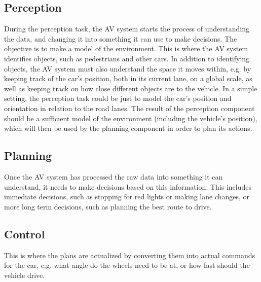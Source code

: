 \subsection{Perception}\label{ssec:tasksForAVs-Perception}
During the perception task, the AV system starts the process of understanding the data, and changing it into something it can use to make decisions.
The objective is to make a model of the environment.
This is where the AV system identifies objects, such as pedestrians and other cars.
In addition to identifying objects, the AV system must also understand the space it moves within, e.g. by keeping track of the car's position, both in its current lane, on a global scale, as well as keeping track on how close different objects are to the vehicle.
In a simple setting, the perception task could be just to model the car's position and orientation in relation to the road lanes.
The result of the perception component should be a sufficient model of the environment (including the vehicle's position), which will then be used by the planning component in order to plan its actions.
\cite{pendleton_perception_2017}

\subsection{Planning}
Once the AV system has processed the raw data into something it can understand, it needs to make decisions based on this information.
This includes immediate decisions, such as stopping for red lights or making lane changes, or more long term decisions, such as planning the best route to drive.
\cite{pendleton_perception_2017}

\subsection{Control}
This is where the plans are actualized by converting them into actual commands for the car, e.g. what angle do the wheels need to be at, or how fast should the vehicle drive.
\cite{pendleton_perception_2017}
